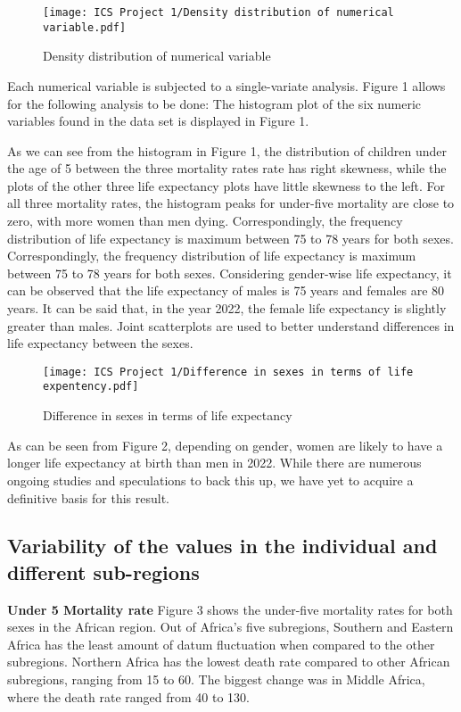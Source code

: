 \documentclass[12 pt]{scrartcl}
\begin{document}
\begin{figure}[ht]
    \centering
    \texttt{[image: ICS Project 1/Density distribution of numerical variable.pdf]}
    \caption{Density distribution of numerical variable}
    \label{fig:my_label}
\end{figure}

Each numerical variable is subjected to a single-variate analysis. Figure 1 allows for the following analysis to be done: The histogram plot of the six numeric variables found in the data set is displayed in Figure 1. 



As we can see from the histogram in Figure 1, the distribution of children under the age of 5 between the three mortality rates rate has right skewness, while the plots of the other three life expectancy plots have little skewness to the left. For all three mortality rates, the histogram peaks for under-five mortality are close to zero, with more women than men dying. Correspondingly, the frequency distribution of life expectancy is maximum between 75 to 78 years for both sexes. Correspondingly, the frequency distribution of life expectancy is maximum between 75 to 78 years for both sexes. Considering gender-wise life expectancy, it can be observed that the life expectancy of males is 75 years and females are 80 years. It can be said that, in the year 2022, the female life expectancy is slightly greater than males. Joint scatterplots are used to better understand differences in life expectancy between the sexes.


\begin{figure}[ht]
    \centering
    \texttt{[image: ICS Project 1/Difference in sexes in terms of life expentency.pdf]}
    \caption{Difference in sexes in terms of life expectancy}
    \label{fig:my_label}
\end{figure}


As can be seen from Figure 2, depending on gender, women are likely to have a longer life expectancy at birth than men in 2022. While there are numerous ongoing studies and speculations to back this up, we have yet to acquire a definitive basis for this result.

\subsection{Variability of the values in the individual and different sub-regions}

\textbf{Under 5 Mortality rate} Figure 3 shows the under-five mortality rates for both sexes in the African region. Out of Africa's five subregions, Southern and Eastern Africa has the least amount of datum fluctuation when compared to the other subregions. Northern Africa has the lowest death rate compared to other African subregions, ranging from 15 to 60. The biggest change was in Middle Africa, where the death rate ranged from 40 to 130.
\end{document}
